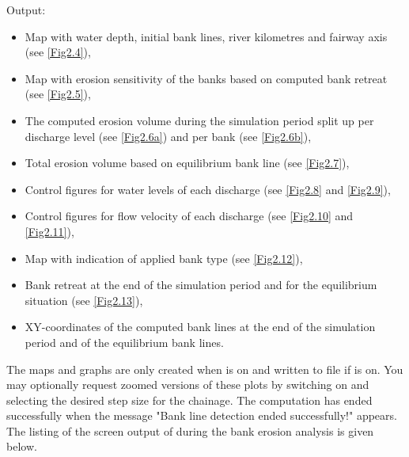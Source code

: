Output:

\begin{itemize}
	\item Map with water depth, initial bank lines, river kilometres and fairway axis (see \autoref{Fig2.4}),
	\item Map with erosion sensitivity of the banks based on computed bank retreat (see \autoref{Fig2.5}),
	\item The computed erosion volume during the simulation period split up per discharge level (see \autoref{Fig2.6a}) and per bank (see \autoref{Fig2.6b}),
	\item Total erosion volume based on equilibrium bank line (see \autoref{Fig2.7}),
	\item Control figures for water levels of each discharge (see \autoref{Fig2.8} and \autoref{Fig2.9}),
	\item Control figures for flow velocity of each discharge (see \autoref{Fig2.10} and \autoref{Fig2.11}),
	\item Map with indication of applied bank type (see \autoref{Fig2.12}),
	\item Bank retreat at the end of the simulation period and for the equilibrium situation (see \autoref{Fig2.13}),
	\item XY-coordinates of the computed bank lines at the end of the simulation period and of the equilibrium bank lines.
\end{itemize}

The maps and graphs are only created when  is on and written to file if  is on.
You may optionally request zoomed versions of these plots by switching on  and selecting the desired step size for the chainage.
The computation has ended successfully when the message "Bank line detection ended successfully!" appears.
The listing of the screen output of \dfastbe during the bank erosion analysis is given below.

